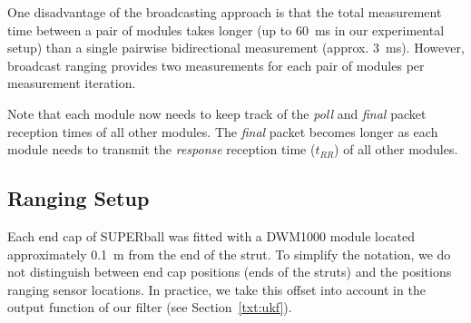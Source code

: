 One disadvantage of the broadcasting approach is that the total measurement time between a pair of modules takes longer (up to \SI{60}{\milli\second} in our experimental setup)
 than a single pairwise bidirectional measurement (approx. \SI{3}{\milli\second}).
However, broadcast ranging provides two measurements for each pair of modules per measurement iteration.

Note that each module now needs to keep track of the \emph{poll} and \emph{final} packet reception times of all other modules.
The \emph{final} packet becomes longer as each module needs to transmit the \emph{response} reception time ($t_{RR}$)  of all other modules.


{%






\subsection{Ranging Setup}
Each end cap of SUPERball was fitted with a DWM1000 module located approximately \SI{0.1}{\metre} from the end of the strut.
To simplify the notation, we do not distinguish between end cap positions (ends of the struts) and the positions ranging sensor locations.
In practice, we take this offset into account in the output function of our filter (see Section~\ref{txt:ukf}).

}
